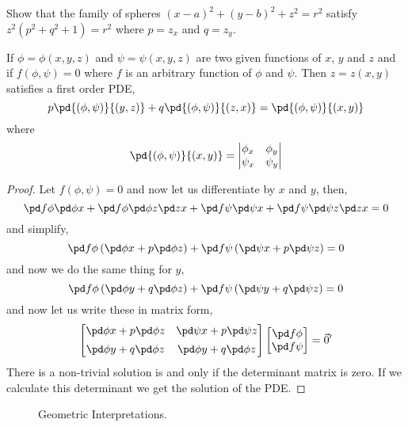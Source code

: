 \begin{exercise}
  Show that the family of spheres $(x - a)^2 + (y - b)^2 + z^2 = r^2$ satisfy $z^2(p^2 + q^2 + 1) = r^2$ where $p = z_x$ and $q = z_y$.
\end{exercise}

\begin{nthm}[]
  If $\phi = \phi(x, y, z)$ and $\psi = \psi(x, y, z)$ are two given functions of $x$, $y$ and $z$ and if $f(\phi, \psi) = 0$ where $f$ is an arbitrary function of $\phi$ and $\psi$. Then $z = z(x, y)$ satisfies a first order PDE,
  $$ p\pd{(\phi, \psi)}{(y, z)} + q\pd{(\phi, \psi)}{(z, x)} = \pd{(\phi, \psi)}{(x, y)} $$
  where
  $$ \pd{(\phi, \psi)}{(x, y)} = \left| \begin{matrix}
    \phi_x & \phi_y \\ \psi_x & \psi_y
  \end{matrix} \right| $$
\end{nthm}
\begin{proof}
  Let $f(\phi, \psi) = 0$ and now let us differentiate by $x$ and $y$, then,
  $$ \pd f \phi \pd \phi x + \pd f \phi\pd \phi z \pd z x + \pd f \psi \pd \psi x + \pd f \psi \pd \psi z \pd z x = 0 $$
  and simplify,
  $$ \pd f \phi \left( \pd \phi x + p\pd \phi z \right) + \pd f \psi \left(\pd \psi x + p\pd \psi z\right) = 0 $$
  and now we do the same thing for $y$,
  $$ \pd f \phi \left( \pd \phi y + q\pd \phi z \right) + \pd f \psi \left( \pd \psi y + q\pd \psi z\right) = 0 $$
  and now let us write these in matrix form,
  $$ \begin{bmatrix}
    \pd \phi x + p\pd \phi z & \pd \psi x + p\pd \psi z\\[5pt]
    \pd \phi y + q\pd \phi z & \pd \phi y + q\pd \phi z
  \end{bmatrix}\begin{bmatrix}
    \pd f \phi \\ \pd f \psi
  \end{bmatrix} = \vec 0'$$
  There is a non-trivial solution is and only if the  determinant matrix is zero. If we calculate this determinant we get the solution of the PDE.
\end{proof}

\begin{wrapfigure}{r}{0.5\textwidth}
  \centering
  \resizebox{0.5\textwidth}{!}{}
  \caption{Geometric Interpretations.}
\end{wrapfigure}

